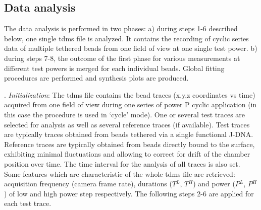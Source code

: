 \documentclass{biophys-new}
\begin{document}
\subsection*{Data analysis}


The data analysis is performed in two phases: a) during steps 1-6 described below, one single tdms file is analyzed. It contains the recording of cyclic series data of multiple tethered beads from one field of view at one single test power. b) during steps 7-8, the outcome of the first phase for various measurements at different test powers is merged for each individual beads. Global fitting procedures are performed and synthesis plots are produced.

. \textit{ Initialization}: %
The tdms file contains the bead traces (x,y,z coordinates vs time) acquired from one field of view during one series of power P cyclic application (in this case the procedure is used in ‘cycle’ mode). One or several test traces are selected for analysis as well as several reference traces (if available). Test traces are typically traces obtained from beads tethered via a single functional J-DNA. Reference traces are typically obtained from beads directly bound to the surface, exhibiting minimal fluctuations and allowing to correct for drift of the chamber position over time. The time interval for the analysis of all traces is also set. Some features which are characteristic of the whole tdms file are retrieved: acquisition frequency (camera frame rate), durations ($T{^L}$, $T{^H}$) and power ($P{^L}$, $P{^H}$) of low and high power step respectively. The following steps 2-6 are applied for each test trace.\\
\end{document}
